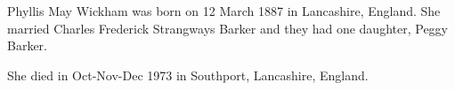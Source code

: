 
Phyllis May Wickham was born on 12 March 1887 in Lancashire, England.  She married Charles Frederick Strangways Barker and they had one daughter, Peggy Barker.  

She died in Oct-Nov-Dec 1973 in Southport, Lancashire, England.\cite{PhyllisWickhamDeath}
